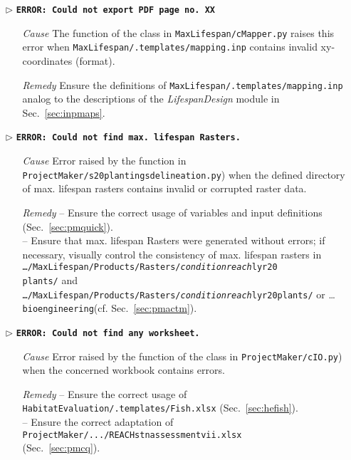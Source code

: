 \begin{itemize}
	\item[$\triangleright$]\textbf{\texttt{ERROR: Could not export PDF page no. XX}}
	\begin{itemize}
		\item[\textit{Cause}\hspace{0.27cm}] The  function of the  class in \texttt{MaxLifespan/cMapper.py} raises this error when \texttt{MaxLifespan/.templates/mapping.inp} contains invalid xy-coordinates (format).
		\item[\textit{Remedy}] Ensure the definitions of \texttt{MaxLifespan/.templates/mapping.inp} analog to the descriptions of the \textit{LifespanDesign} module in Sec.~\ref{sec:inpmaps}.\\
	\end{itemize}
	
	\item[$\triangleright$]\textbf{\texttt{ERROR: Could not find max. lifespan Rasters.}}
	\begin{itemize}
		\item[\textit{Cause}\hspace{0.27cm}] Error raised by the  function in \texttt{ProjectMaker/s20{\myUnderscore}plantings{\myUnderscore}delineation.py}) when the defined directory of max. lifespan rasters contains invalid or corrupted raster data.
		\item[\textit{Remedy}] -- Ensure the correct usage of variables and input definitions (Sec.~\ref{sec:pmquick}).\\
		-- Ensure that max. lifespan Rasters were generated without errors; if necessary, visually control the consistency of max. lifespan rasters in \texttt{\ldots{}/MaxLifespan/Products/Rasters/\emph{condition}{\myUnderscore}\emph{reach}{\myUnderscore}lyr20{\myUnderscore}\\plants/} and \texttt{\ldots{}/MaxLifespan/Products/}\texttt{Rasters/\emph{condition}{\myUnderscore}\emph{reach}{\myUnderscore}lyr20{\myUnderscore}plants/} or \ldots{}\texttt{bioengineering}(cf. Sec.~\ref{sec:pmactm}).\\
	\end{itemize}
	
	\item[$\triangleright$]\textbf{\texttt{ERROR: Could not find any worksheet.}}
	\begin{itemize}
		\item[\textit{Cause}\hspace{0.27cm}] Error raised by the  function of the  class in \texttt{ProjectMaker/cIO.py}) when the concerned workbook contains errors.
		\item[\textit{Remedy}] -- Ensure the correct usage of \texttt{HabitatEvaluation/.templates/Fish.xlsx} (Sec.~\ref{sec:hefish}).\\
		-- Ensure the correct adaptation of \texttt{ProjectMaker/.../REACH{\myUnderscore}stn{\myUnderscore}assessment{\myUnderscore}vii.xlsx}\\    (Sec.~\ref{sec:pmcq}).\\
	\end{itemize}
	

\end{itemize}
